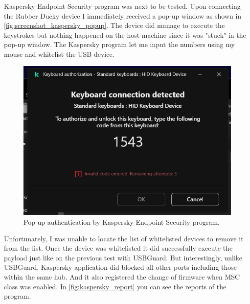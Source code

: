 Kaspersky Endpoint Security program was next to be tested. Upon connecting the Rubber Ducky device I immediately received a pop-up window as shown in \autoref{fig:screenshot_kaspersky_popup}. The device did manage to execute the keystrokes but nothing happened on the host machine since it was "stuck" in the pop-up window. The Kaspersky program let me input the numbers using my mouse and whitelist the USB device.
\begin{figure}[ht]
    \centering
    \includegraphics[width=\linewidth]{./obrazky-figures/kaspersky_keyboard_test.png}
    \caption{Pop-up authentication by Kaspersky Endpoint Security program.}
    \label{fig:screenshot_kaspersky_popup}
\end{figure}
Unfortunately, I was unable to locate the list of whitelisted devices to remove it from the list. Once the device was whitelisted it did successfully execute the payload just like on the previous test with USBGuard. But interestingly, unlike USBGuard, Kaspersky application did blocked all other ports including those within the same hub. And it also registered the change of firmware when MSC class was enabled. In \autoref{fig:kaspersky_report} you can see the reports of the program.
